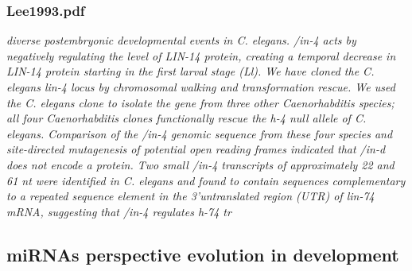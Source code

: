 \documentclass[graybox]{svmult}
\begin{document}
\subsubsection{Lee1993.pdf}

\cite{Lee1993}
\textit{diverse postembryonic developmental events in C.
elegans. /in-4 acts by negatively regulating the level of
LIN-14 protein, creating a temporal decrease in LIN-14
protein starting in the first larval stage (Ll). We have
cloned the C. elegans lin-4 locus by chromosomal
walking and transformation rescue. We used the C.
elegans clone to isolate the gene from three other
Caenorhabditis species; all four Caenorhabditis clones
functionally rescue the h-4 null allele of C. elegans.
Comparison of the /in-4 genomic sequence from these
four species and site-directed mutagenesis of potential
open reading frames indicated that /in-d does not
encode a protein. Two small /in-4 transcripts of approximately
22 and 61 nt were identified in C. elegans and
found to contain sequences complementary to a repeated
sequence element in the 3'untranslated region
(UTR) of lin-74 mRNA, suggesting that /in-4 regulates
h-74 tr}


\subsection{miRNAs perspective evolution in development}
\end{document}
